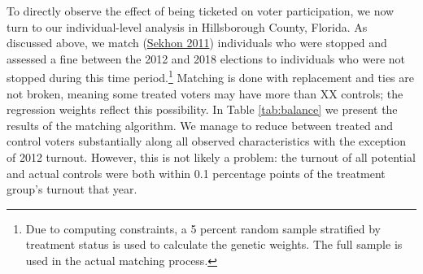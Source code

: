 \documentclass[
  12pt,
]{article}
\begin{document}
To directly observe the effect of being ticketed on voter participation, we now turn to our individual-level analysis in Hillsborough County, Florida. As discussed above, we match (\protect\hyperlink{ref-Sekhon2011}{Sekhon 2011}) individuals who were stopped and assessed a fine between the 2012 and 2018 elections to individuals who were not stopped during this time period.\footnote{Due to computing constraints, a 5 percent random sample stratified by treatment status is used to calculate the genetic weights. The full sample is used in the actual matching process.} Matching is done with replacement and ties are not broken, meaning some treated voters may have more than XX controls; the regression weights reflect this possibility. In Table \ref{tab:balance} we present the results of the matching algorithm. We manage to reduce between treated and control voters substantially along all observed characteristics with the exception of 2012 turnout. However, this is not likely a problem: the turnout of all potential and actual controls were both within 0.1 percentage points of the treatment group's turnout that year.

\begin{singlespace}
\begin{table}[H]

\caption{\label{tab:baltab-chunk}\label{tab:balance} Balance Table}
\centering
{}
\end{table}
\end{singlespace}
\end{document}
